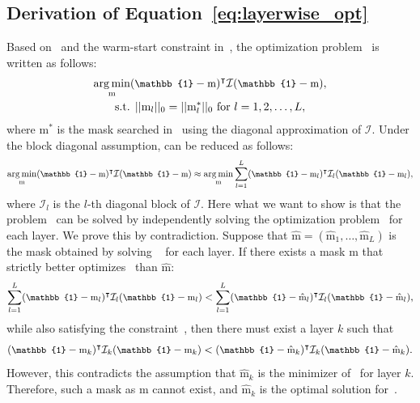\subsection{\textbf{Derivation of Equation~\ref{eq:layerwise_opt}}}
\label{appendix:derivation_block_diagonal}

Based on~ and the warm-start constraint in~, the optimization problem~ is written as follows:
\begin{gather}
\small
    \argmin_{\text{m}} (\mathbb{1} - \text{m})^\intercal \mathcal{I} (\mathbb{1} - \text{m}), \label{eq:argmin_fisher} \\
    \text{s.t. } || \text{m}_l ||_0 = || \text{m}^\ast_l ||_0 \ \text{for } l = 1, 2, \dots, L \label{eq:warmup_constraint},
\end{gather}
where $\text{m}^\ast$ is the mask searched in~ using the diagonal approximation of $\mathcal{I}$.
Under the block diagonal assumption,  can be reduced as follows:
\begin{gather}
\small
    \argmin_{\text{m}} (\mathbb{1} - \text{m})^\intercal \mathcal{I} (\mathbb{1} - \text{m}) \approx \argmin_{\text{m}} \sum_{l=1}^L (\mathbb{1} - \text{m}_l)^\intercal \mathcal{I}_l (\mathbb{1} - \text{m}_l), \label{eq:argmin_block_sum}
\end{gather}
where $\mathcal{I}_l$ is the $l$-th diagonal block of $\mathcal{I}$.
Here what we want to show is that the problem~ can be solved by independently solving the optimization problem~ for each layer.
We prove this by contradiction.
Suppose that $\hat{\text{m}} = ({\hat{\text{m}}}_1, \dots, {\hat{\text{m}}}_L)$ is the mask obtained by solving ~ for each layer.
If there exists a mask $\text{m}$ that strictly better optimizes~ than $\hat{\text{m}}$:
\begin{gather}
\small
    \sum_{l=1}^L (\mathbb{1} - \text{m}_l)^\intercal \mathcal{I}_l (\mathbb{1} - \text{m}_l) < \sum_{l=1}^L (\mathbb{1} - {\hat{\text{m}}}_l)^\intercal \mathcal{I}_l (\mathbb{1} - {\hat{\text{m}}}_l),
\end{gather}
while also satisfying the constraint~, then there must exist a layer $k$ such that
\begin{gather}
\small
    (\mathbb{1} - \text{m}_k)^\intercal \mathcal{I}_k (\mathbb{1} - \text{m}_k) < (\mathbb{1} - {\hat{\text{m}}}_k)^\intercal \mathcal{I}_k (\mathbb{1} - {\hat{\text{m}}}_k).
\end{gather}
However, this contradicts the assumption that ${\hat{\text{m}}}_k$ is the minimizer of~ for layer $k$.
Therefore, such a mask as $\text{m}$ cannot exist, and ${\hat{\text{m}}}_k$ is the optimal solution for~.

